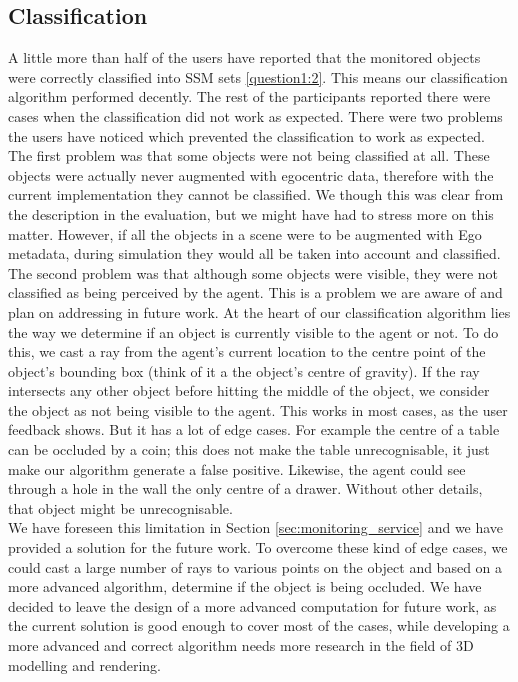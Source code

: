 \subsection{Classification} %
\label{sec:eval_classification}
A little more than half of the users have reported that the monitored objects were correctly classified into SSM sets \ref{question1:2}. This means our classification algorithm performed decently. The rest of the participants reported there were cases when the classification did not work as expected. There were two problems the users have noticed which prevented the classification to work as expected.\\

The first problem was that some objects were not being classified at all. These objects were actually never augmented with egocentric data, therefore with the current implementation they cannot be classified. We though this was clear from the description in the evaluation, but we might have had to stress more on this matter. However, if all the objects in a scene were to be augmented with Ego metadata, during simulation they would all be taken into account and classified.\\

The second problem was that although some objects were visible, they were not classified as being perceived by the agent. This is a problem we are aware of and plan on addressing in future work. At the heart of our classification algorithm lies the way we determine if an object is currently visible to the agent or not. To do this, we cast a ray from the agent's current location to the centre point of the object's bounding box (think of it a the object's centre of gravity). If the ray intersects any other object before hitting the middle of the object, we consider the object as not being visible to the agent. This works in most cases, as the user feedback shows. But it has a lot of edge cases. For example the centre of a table can be occluded by a coin; this does not make the table unrecognisable, it just make our algorithm generate a false positive. Likewise, the agent could see through a hole in the wall the only centre of a drawer. Without other details, that object might be unrecognisable.\\

We have foreseen this limitation in Section \ref{sec:monitoring_service} and we have provided a solution for the future work. To overcome these kind of edge cases, we could cast a large number of rays to various points on the object and based on a more advanced algorithm, determine if the object is being occluded. We have decided to leave the design of a more advanced computation for future work, as the current solution is good enough to cover most of the cases, while developing a more advanced and correct algorithm needs more research in the field of 3D modelling and rendering.\\

